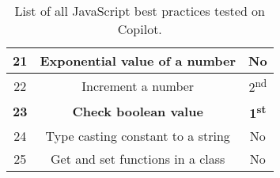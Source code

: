 \begin{table}[hbt!]
\begin{tabular}{|c|c|c|}
          \hline
          21 & Exponential value of a number & No \\
          \hline
          22 & Increment a number & 2\textsuperscript{nd} \\
          \hline
          \textbf{23} & \textbf{Check boolean value} & \textbf{1\textsuperscript{st}} \\
          \hline
          24 & Type casting constant to a string & No \\
          \hline
          25 & Get and set functions in a class & No \\
          \hline
    \end{tabular}
    \caption{List of all JavaScript best practices tested on Copilot.}
    \label{tab:all_bp}
\end{table}